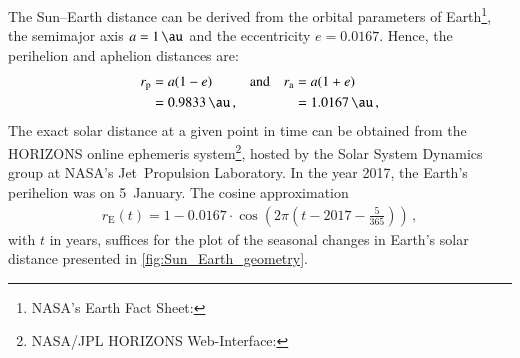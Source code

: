 The Sun--Earth distance can be derived from the orbital parameters of Earth\footnote{NASA's Earth Fact Sheet: }, the semimajor axis $a = \SI{1}{\au}$ and the eccentricity $e = \num{0.0167}$. Hence, the perihelion and aphelion distances are:
\begin{align*}
	r_\text{p} &= a (1 - e)	&	&\text{and}	&	r_\text{a} &= a (1 + e)\\
		&= \SI{0.9833}{\au}	\,,	&	&	&	&= \SI{1.0167}{\au}	\,,
\end{align*}
The exact solar distance at a given point in time can be obtained from the HORIZONS online ephemeris system\footnote{NASA/JPL HORIZONS Web-Interface: }, hosted by the Solar System Dynamics group at NASA's Jet~Propulsion Laboratory. In the year 2017, the Earth's perihelion was on 5~January.
The cosine approximation
\begin{align}
	r_\text{E}(t) = 1 - 0.0167 \cdot \cos\left(2 \pi \left(t - 2017 - \frac{5}{365}\right)\right)\,,
\end{align}
with $t$ in years, suffices for the plot of the seasonal changes in Earth's solar distance presented in \autoref{fig:Sun_Earth_geometry}.
\begin{figure}[htb]
\end{figure}
